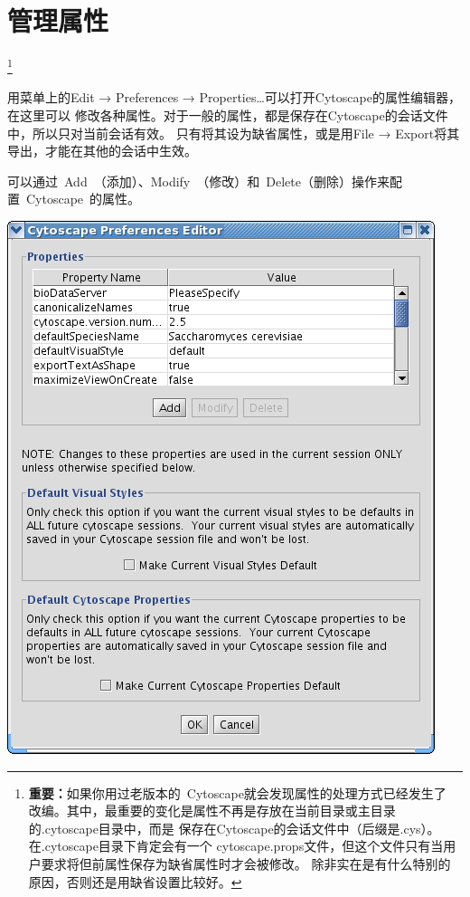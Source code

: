 \section{管理属性}
\footnote{{\bf 重要：}如果你用过老版本的~Cytoscape就会发现属性的处理方式已经发生了
改编。其中，最重要的变化是属性不再是存放在当前目录或主目录的.cytoscape目录中，而是
保存在Cytoscape的会话文件中（后缀是.cys）。在.cytoscape目录下肯定会有一个
cytoscape.props文件，但这个文件只有当用户要求将但前属性保存为缺省属性时才会被修改。
除非实在是有什么特别的原因，否则还是用缺省设置比较好。}

用菜单上的Edit → Preferences → Properties…可以打开Cytoscape的属性编辑器，在这里可以
修改各种属性。对于一般的属性，都是保存在Cytoscape的会话文件中，所以只对当前会话有效。
只有将其设为缺省属性，或是用File → Export将其导出，才能在其他的会话中生效。

可以通过~Add~（添加）、Modify~（修改）和~Delete（删除）操作来配置~Cytoscape~的属性。\\
\begin{center}
\includegraphics[width=\textwidth]{images/prefs_editor.png} 
\end{center}

